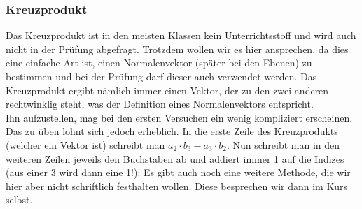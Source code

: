 	\subsubsection{Kreuzprodukt}
		Das Kreuzprodukt ist in den meisten Klassen kein Unterrichtsstoff und wird
		auch nicht in der Prüfung abgefragt. Trotzdem wollen wir es hier ansprechen,
		da dies eine einfache Art ist, einen Normalenvektor (später bei den Ebenen) zu
		bestimmen und bei der Prüfung darf dieser auch verwendet werden. Das
		Kreuzprodukt ergibt nämlich immer einen Vektor, der zu den zwei anderen
		rechtwinklig steht, was der Definition eines Normalenvektors entspricht.\\
		Ihn aufzustellen, mag bei den ersten Versuchen ein wenig kompliziert
		erscheinen. Das zu üben lohnt sich jedoch erheblich. In die erste Zeile des
		Kreuzprodukts (welcher ein Vektor ist) schreibt man \(a_2\cdot b_3-a_3\cdot
		b_2\). Nun schreibt man in den weiteren Zeilen jeweils den Buchstaben ab und
		addiert immer 1 auf die Indizes (aus einer 3 wird dann eine 1!):
		\formel{
			\[\vec{a} \times \vec{b}=
			\begin{pmatrix}
			 a_2b_3-a_3b_2\\
			 a_3b_1-a_1b_3\\
			 a_1b_2-a_2b_1
			\end{pmatrix}\]
		}
		Es gibt auch noch eine weitere Methode, die wir hier aber nicht schriftlich
		festhalten wollen. Diese besprechen wir dann im Kurs selbst.

